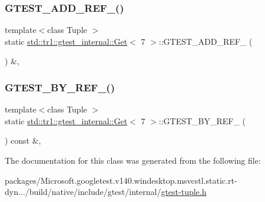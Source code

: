 \subsubsection{\texorpdfstring{GTEST\_ADD\_REF\_()}{GTEST\_ADD\_REF\_()}}
{\footnotesize\ttfamily template$<$class Tuple $>$ \\
static \mbox{\hyperlink{classstd_1_1tr1_1_1gtest__internal_1_1_get}{std\+::tr1\+::gtest\+\_\+internal\+::\+Get}}$<$ 7 $>$\+::G\+T\+E\+S\+T\+\_\+\+A\+D\+D\+\_\+\+R\+E\+F\+\_\+ (\begin{DoxyParamCaption}\item[{\mbox{\hyperlink{gtest-tuple_8h_a1b7f133d8aa02e0b7afed7b66781eeb7}{G\+T\+E\+S\+T\+\_\+\+T\+U\+P\+L\+E\+\_\+\+E\+L\+E\+M\+E\+N\+T\+\_\+}}(7, Tuple)}]{ }\end{DoxyParamCaption}) \&\hspace{0.3cm}{\ttfamily [inline]}, {\ttfamily [static]}}

\mbox{\label{classstd_1_1tr1_1_1gtest__internal_1_1_get_3_017_01_4_afb7bd56e0697304325cd157d11df4a7b}} 
\subsubsection{\texorpdfstring{GTEST\_BY\_REF\_()}{GTEST\_BY\_REF\_()}}
{\footnotesize\ttfamily template$<$class Tuple $>$ \\
static \mbox{\hyperlink{classstd_1_1tr1_1_1gtest__internal_1_1_get}{std\+::tr1\+::gtest\+\_\+internal\+::\+Get}}$<$ 7 $>$\+::G\+T\+E\+S\+T\+\_\+\+B\+Y\+\_\+\+R\+E\+F\+\_\+ (\begin{DoxyParamCaption}\item[{\mbox{\hyperlink{gtest-tuple_8h_a1b7f133d8aa02e0b7afed7b66781eeb7}{G\+T\+E\+S\+T\+\_\+\+T\+U\+P\+L\+E\+\_\+\+E\+L\+E\+M\+E\+N\+T\+\_\+}}(7, Tuple)}]{ }\end{DoxyParamCaption}) const \&\hspace{0.3cm}{\ttfamily [inline]}, {\ttfamily [static]}}



The documentation for this class was generated from the following file\+:\begin{DoxyCompactItemize}
\item 
packages/\+Microsoft.\+googletest.\+v140.\+windesktop.\+msvcstl.\+static.\+rt-\/dyn.../build/native/include/gtest/internal/\mbox{\hyperlink{gtest-tuple_8h}{gtest-\/tuple.\+h}}\end{DoxyCompactItemize}
